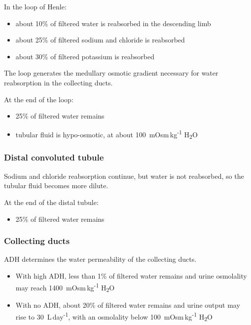 \documentclass[11pt,a4paper]{article}
\begin{document}
In the loop of Henle:
\begin{itemize}
    \item about 10\% of filtered water is reabsorbed in the descending limb
    \item about 25\% of filtered sodium and chloride is reabsorbed
    \item about 30\% of filtered potassium is reabsorbed
\end{itemize}

The loop generates the medullary osmotic gradient necessary for water reabsorption in the collecting ducts.

At the end of the loop:
\begin{itemize}
    \item 25\% of filtered water remains
    \item tubular fluid is hypo-osmotic, at about 100~mOsm\,kg\textsuperscript{-1} H\textsubscript{2}O
\end{itemize}

\subsubsection{Distal convoluted tubule}

Sodium and chloride reabsorption continue, but water is not reabsorbed, so the tubular fluid becomes more dilute.

At the end of the distal tubule:
\begin{itemize}
    \item 25\% of filtered water remains
\end{itemize}

\subsubsection{Collecting ducts}

ADH determines the water permeability of the collecting ducts.

\begin{itemize}
    \item With high ADH, less than 1\% of filtered water remains and urine osmolality may reach 1400~mOsm\,kg\textsuperscript{-1} H\textsubscript{2}O
    \item With no ADH, about 20\% of filtered water remains and urine output may rise to 30~L\,day\textsuperscript{-1}, with an osmolality below 100~mOsm\,kg\textsuperscript{-1} H\textsubscript{2}O
\end{itemize}
\end{document}
